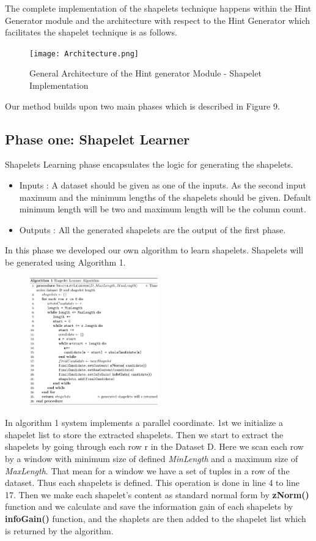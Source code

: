 \documentclass[conference]{IEEEtran}  %
\begin{document}
The complete implementation of the shapelets technique happens within the Hint Generator module and the architecture with respect to the Hint Generator which facilitates the shapelet technique is as follows.

\begin{figure}[h!]
\texttt{[image: Architecture.png]}
\caption{General Architecture of the Hint generator Module - Shapelet Implementation}
\end{figure}

Our method builds upon two main phases which is described in Figure 9.

\subsection{Phase one: Shapelet Learner}
Shapelets Learning phase encapsulates the logic for generating the shapelets.
\begin{itemize}
\item Inputs : A dataset should be given as one of the inputs. As the second input maximum and the minimum lengths of the shapelets should be given. Default minimum length will be two and maximum length will be the column count.
\item Outputs : All the generated shapelets are the output of the first phase.
\end{itemize}

In this phase we developed our own algorithm to learn shapelets. Shapelets will be generated using Algorithm 1.

\begin{figure}[h!]
\includegraphics[width=0.5\textwidth]{algo1.png}
\end{figure}


In algorithm 1 system implements a parallel coordinate. 1st we initialize a shapelet list to store the extracted shapelets. Then we start to extract the shapelets by going through each row r in the Dataset D. Here we scan each row by a window with minimum size of defined \textit{MinLength} and a maximum size of \textit{MaxLength}. That mean for a window we have a set of tuples in a row of the dataset. Thus each shapelets is defined. This operation is done in line 4 to line 17. Then we make each shapelet’s content as standard normal form by \textbf{zNorm()} function and we calculate and save the information gain of each shapelets by \textbf{infoGain()} function, and the shaplets are then added to the shapelet list which is returned by the algorithm.
\end{document}
